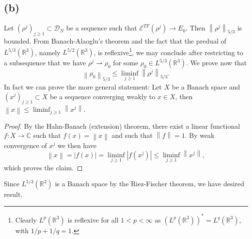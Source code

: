 \documentclass[a4paper,11pt]{article}
\newcommand{\norm}[1]{\left\lVert #1 \right\rVert}
\newcommand{\abs}[1]{\left\lvert #1 \right\rvert}
\newcommand{\R}{\mathbb{R}}
\newcommand{\C}{\mathbb{C}}
\numberwithin{equation}{section}
\begin{document}
\subsection*{(b)}
Let $ (\rho^j)_{j\geq1}\subset \mathcal{D}_N $ be a sequence such that $ \mathcal{E}^{TF}(\rho^j)\to E_0 $. Then $ \norm{\rho^j}_{5/3} $ is bounded. From Banach-Alaoglu's theorem and the fact that the predual of $ L^{5/3}(\R^3) $, namely $ L^{5/2}(\R^3) $, is reflexive\footnote{Clearly $ L^p(\R^3) $ is reflexive for all $ 1<p<\infty $ as $ (L^p(\R^3))^\ast=L^q(\R^3) $, with $ 1/p+1/q=1 $.}, we may conclude after restricting to a subsequence that we have $ \rho^j\rightharpoonup\rho_0 $ for some $ \rho_0\in L^{5/3}(\R^3) $. We prove now that \begin{equation}
\norm{\rho_0}_{5/3}\leq\liminf_{j\geq1}\norm{\rho^j}_{5/3}.
\end{equation}
In fact we can prove the more general statement: Let $ X $ be a Banach space and $ (x^j)_{j\geq1}\subset X $ be a sequence converging weakly to $ x\in X $, then $ \norm{x}\leq\liminf_{j\geq1}\norm{x^j} $.
\begin{proof}
	By the Hahn-Banach (extension) theorem, there exist a linear functional $ f:X\to \C $ such that $ f(x)=\norm{x} $ and such that $ \norm{f}=1 $. By weak convergence of $ x^j $ we then have \begin{equation}
	\norm{x}=\abs{f(x)}=\liminf_{j\geq 1}\abs{f(x^j)}\leq\liminf_{j\geq1}\norm{x^j},
	\end{equation}
	which proves the claim.
\end{proof}
Since $ L^{5/3}(\R^3) $ is a Banach space by the Riez-Fischer theorem, we have desired result.
\end{document}
